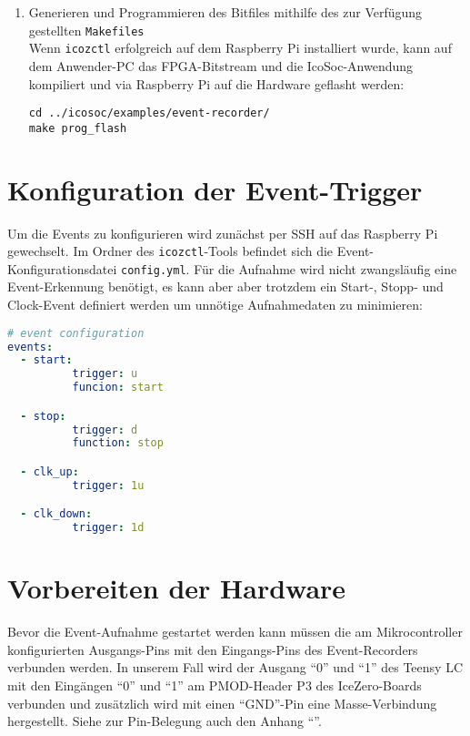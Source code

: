 \begin{enumerate}
\item Generieren und Programmieren des Bitfiles mithilfe des zur Verfügung gestellten {\tt Makefiles}\\
Wenn {\tt icozctl} erfolgreich auf dem Raspberry Pi installiert wurde, kann auf dem Anwender-PC das FPGA-Bitstream und die 
IcoSoc-Anwendung kompiliert und via Raspberry Pi auf die Hardware geflasht werden:
\begin{verbatim}
cd ../icosoc/examples/event-recorder/
make prog_flash
\end{verbatim}

 
\end{enumerate}

\section{Konfiguration der Event-Trigger}
\label{ch:Anwendungsfall:sec:Event-Trigger}

Um die Events zu konfigurieren wird zunächst per SSH auf das Raspberry Pi gewechselt.  
Im Ordner des {\tt icozctl}-Tools befindet sich die Event-Konfigurationsdatei {\tt config.yml}.
Für die Aufnahme wird nicht zwangsläufig eine Event-Erkennung benötigt, es kann aber aber trotzdem ein Start-, Stopp- und Clock-Event definiert werden um unnötige Aufnahmedaten zu minimieren:

\begin{lstlisting}[language=yaml]
# event configuration
events: 
  - start:
          trigger: u
          funcion: start

  - stop:
          trigger: d
          function: stop

  - clk_up:
          trigger: 1u

  - clk_down:
          trigger: 1d
\end{lstlisting}

\section{Vorbereiten der Hardware}
\label{ch:Anwendungsfall:sec:Vorbereitung}

Bevor die Event-Aufnahme gestartet werden kann müssen die am Mikrocontroller konfigurierten Ausgangs-Pins mit den Eingangs-Pins des Event-Recorders verbunden werden.
In unserem Fall wird der Ausgang ``0'' und ``1'' des Teensy LC mit den Eingängen ``0'' und ``1'' am PMOD-Header P3 des IceZero-Boards verbunden und zusätzlich wird mit einen ``GND''-Pin eine Masse-Verbindung hergestellt. Siehe zur Pin-Belegung auch den Anhang ``''. 

